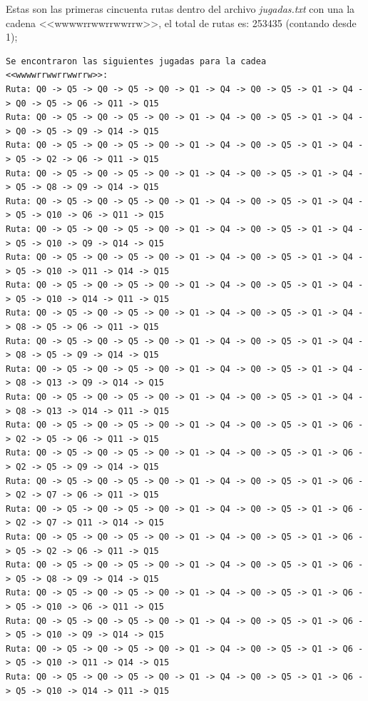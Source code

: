 \documentclass{article}
\begin{document}
    Estas son las primeras cincuenta rutas dentro del archivo \textit{jugadas.txt} con una la cadena <<wwwwrrwwrrwwrrw>>,
    el total de rutas es: 253435 (contando desde 1);
    \begin{lstlisting}[language={},basicstyle=\ttfamily\footnotesize, breaklines=true]
Se encontraron las siguientes jugadas para la cadea <<wwwwrrwwrrwwrrw>>:
Ruta: Q0 -> Q5 -> Q0 -> Q5 -> Q0 -> Q1 -> Q4 -> Q0 -> Q5 -> Q1 -> Q4 -> Q0 -> Q5 -> Q6 -> Q11 -> Q15
Ruta: Q0 -> Q5 -> Q0 -> Q5 -> Q0 -> Q1 -> Q4 -> Q0 -> Q5 -> Q1 -> Q4 -> Q0 -> Q5 -> Q9 -> Q14 -> Q15
Ruta: Q0 -> Q5 -> Q0 -> Q5 -> Q0 -> Q1 -> Q4 -> Q0 -> Q5 -> Q1 -> Q4 -> Q5 -> Q2 -> Q6 -> Q11 -> Q15
Ruta: Q0 -> Q5 -> Q0 -> Q5 -> Q0 -> Q1 -> Q4 -> Q0 -> Q5 -> Q1 -> Q4 -> Q5 -> Q8 -> Q9 -> Q14 -> Q15
Ruta: Q0 -> Q5 -> Q0 -> Q5 -> Q0 -> Q1 -> Q4 -> Q0 -> Q5 -> Q1 -> Q4 -> Q5 -> Q10 -> Q6 -> Q11 -> Q15
Ruta: Q0 -> Q5 -> Q0 -> Q5 -> Q0 -> Q1 -> Q4 -> Q0 -> Q5 -> Q1 -> Q4 -> Q5 -> Q10 -> Q9 -> Q14 -> Q15
Ruta: Q0 -> Q5 -> Q0 -> Q5 -> Q0 -> Q1 -> Q4 -> Q0 -> Q5 -> Q1 -> Q4 -> Q5 -> Q10 -> Q11 -> Q14 -> Q15
Ruta: Q0 -> Q5 -> Q0 -> Q5 -> Q0 -> Q1 -> Q4 -> Q0 -> Q5 -> Q1 -> Q4 -> Q5 -> Q10 -> Q14 -> Q11 -> Q15
Ruta: Q0 -> Q5 -> Q0 -> Q5 -> Q0 -> Q1 -> Q4 -> Q0 -> Q5 -> Q1 -> Q4 -> Q8 -> Q5 -> Q6 -> Q11 -> Q15
Ruta: Q0 -> Q5 -> Q0 -> Q5 -> Q0 -> Q1 -> Q4 -> Q0 -> Q5 -> Q1 -> Q4 -> Q8 -> Q5 -> Q9 -> Q14 -> Q15
Ruta: Q0 -> Q5 -> Q0 -> Q5 -> Q0 -> Q1 -> Q4 -> Q0 -> Q5 -> Q1 -> Q4 -> Q8 -> Q13 -> Q9 -> Q14 -> Q15
Ruta: Q0 -> Q5 -> Q0 -> Q5 -> Q0 -> Q1 -> Q4 -> Q0 -> Q5 -> Q1 -> Q4 -> Q8 -> Q13 -> Q14 -> Q11 -> Q15
Ruta: Q0 -> Q5 -> Q0 -> Q5 -> Q0 -> Q1 -> Q4 -> Q0 -> Q5 -> Q1 -> Q6 -> Q2 -> Q5 -> Q6 -> Q11 -> Q15
Ruta: Q0 -> Q5 -> Q0 -> Q5 -> Q0 -> Q1 -> Q4 -> Q0 -> Q5 -> Q1 -> Q6 -> Q2 -> Q5 -> Q9 -> Q14 -> Q15
Ruta: Q0 -> Q5 -> Q0 -> Q5 -> Q0 -> Q1 -> Q4 -> Q0 -> Q5 -> Q1 -> Q6 -> Q2 -> Q7 -> Q6 -> Q11 -> Q15
Ruta: Q0 -> Q5 -> Q0 -> Q5 -> Q0 -> Q1 -> Q4 -> Q0 -> Q5 -> Q1 -> Q6 -> Q2 -> Q7 -> Q11 -> Q14 -> Q15
Ruta: Q0 -> Q5 -> Q0 -> Q5 -> Q0 -> Q1 -> Q4 -> Q0 -> Q5 -> Q1 -> Q6 -> Q5 -> Q2 -> Q6 -> Q11 -> Q15
Ruta: Q0 -> Q5 -> Q0 -> Q5 -> Q0 -> Q1 -> Q4 -> Q0 -> Q5 -> Q1 -> Q6 -> Q5 -> Q8 -> Q9 -> Q14 -> Q15
Ruta: Q0 -> Q5 -> Q0 -> Q5 -> Q0 -> Q1 -> Q4 -> Q0 -> Q5 -> Q1 -> Q6 -> Q5 -> Q10 -> Q6 -> Q11 -> Q15
Ruta: Q0 -> Q5 -> Q0 -> Q5 -> Q0 -> Q1 -> Q4 -> Q0 -> Q5 -> Q1 -> Q6 -> Q5 -> Q10 -> Q9 -> Q14 -> Q15
Ruta: Q0 -> Q5 -> Q0 -> Q5 -> Q0 -> Q1 -> Q4 -> Q0 -> Q5 -> Q1 -> Q6 -> Q5 -> Q10 -> Q11 -> Q14 -> Q15
Ruta: Q0 -> Q5 -> Q0 -> Q5 -> Q0 -> Q1 -> Q4 -> Q0 -> Q5 -> Q1 -> Q6 -> Q5 -> Q10 -> Q14 -> Q11 -> Q15

\end{lstlisting}
\end{document}
